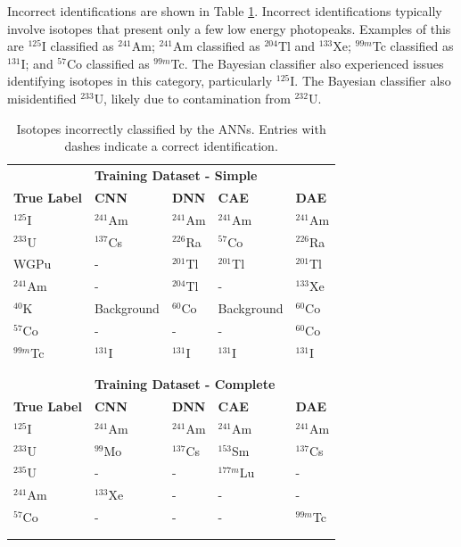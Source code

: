 Incorrect identifications are shown in Table \ref{table:anns_incorrect}. Incorrect identifications typically involve isotopes that present only a few low energy photopeaks. Examples of this are $^{125}$I classified as $^{241}$Am; $^{241}$Am classified as $^{204}$Tl and $^{133}$Xe; $^{99m}$Tc classified as $^{131}$I; and $^{57}$Co classified as $^{99m}$Tc. The Bayesian classifier also experienced issues identifying isotopes in this category, particularly $^{125}$I. The Bayesian classifier also misidentified $^{233}$U, likely due to contamination from $^{232}$U.

\begin{table}[H]
	\centering
	\caption{Isotopes incorrectly classified by the ANNs. Entries with dashes indicate a correct identification.}
	\label{table:anns_incorrect}
	\begin{tabular}{lllll}
		\hline
		& \multicolumn{4}{l}{\textbf{Training Dataset - Simple}} \\
		\textbf{True Label} & \textbf{CNN} & \textbf{DNN} & \textbf{CAE} & \textbf{DAE} \\ \hline
		$^{125}$I & $^{241}$Am & $^{241}$Am & $^{241}$Am & $^{241}$Am \\ 
		$^{233}$U & $^{137}$Cs & $^{226}$Ra & $^{57}$Co &  $^{226}$Ra  \\ 
		WGPu & - & $^{201}$Tl & $^{201}$Tl & $^{201}$Tl \\ 
		$^{241}$Am & - & $^{204}$Tl &- & $^{133}$Xe \\
		$^{40}$K & Background & $^{60}$Co & Background & $^{60}$Co \\
		$^{57}$Co & - & - & - & $^{60}$Co \\
		$^{99m}$Tc & $^{131}$I & $^{131}$I & $^{131}$I & $^{131}$I \\ \hline \\ \\
		
		\hline
		& \multicolumn{4}{l}{\textbf{Training Dataset - Complete}} \\
		\textbf{True Label} & \textbf{CNN} & \textbf{DNN} & \textbf{CAE} & \textbf{DAE} \\ \hline
		$^{125}$I & $^{241}$Am & $^{241}$Am & $^{241}$Am & $^{241}$Am  \\ 
		$^{233}$U & $^{99}$Mo & $^{137}$Cs & $^{153}$Sm &  $^{137}$Cs \\ 
		$^{235}$U & - & - &  $^{177m}$Lu  & - \\ 
		$^{241}$Am & $^{133}$Xe & - & - & - \\	
		$^{57}$Co & - & - & - & $^{99m}$Tc \\ \hline \\ \\
	\end{tabular}
\end{table}


